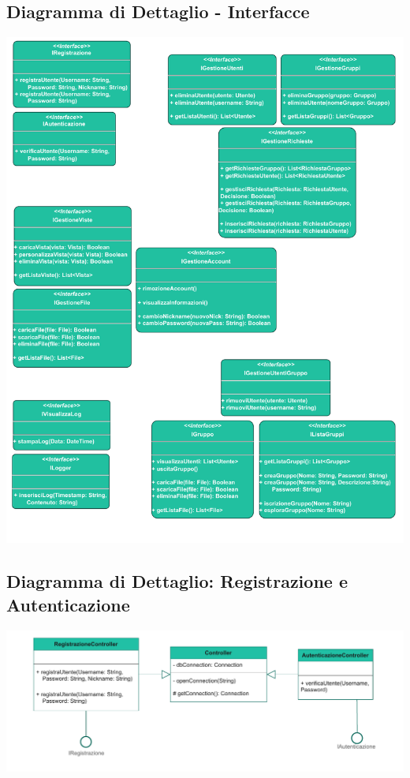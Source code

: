 \subsection*{Diagramma di Dettaglio - Interfacce}
{}
\vspace{0.5cm}
\begin{adjustwidth}{-2.5cm}{0cm}
\includegraphics[scale=0.9]{progettazione/Progettazione-Interfacce.drawio.pdf}
\end{adjustwidth}
\vspace{1cm}


\subsection*{Diagramma di Dettaglio: Registrazione e Autenticazione}
{}
\begin{adjustwidth}{-2cm}{0cm}
\includegraphics[scale=0.9]{progettazione/Progettazione-Dettaglio Autenticazione.drawio.pdf}
\end{adjustwidth}
\vspace{2cm}

